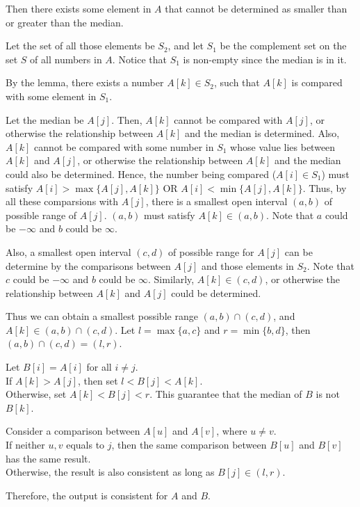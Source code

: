 \documentclass[10pt]{article}
\newcommand{\oor}{\mbox{ OR }}
\begin{document}
\begin{enumerate}
	Then there exists some element in $A$ that cannot be determined as smaller
	than or greater than the median.

	Let the set of all those elements be $S_2$, and let $S_1$ be the complement set
	on the set $S$ of all numbers in $A$.
	Notice that $S_1$ is non-empty since the median is in it.

	By the lemma, there exists a number $A[k] \in S_2$, such that $A[k]$ is
	compared with some element in $S_1$.

	Let the median be $A[j]$.
	Then, $A[k]$ cannot be compared with $A[j]$, or otherwise the relationship
	between $A[k]$ and the median is determined.
	Also, $A[k]$ cannot be compared with some number in $S_1$ whose value lies
	between $A[k]$ and $A[j]$, or otherwise the relationship between $A[k]$ and
	the median could also be determined.
	Hence, the number being compared ($A[i] \in S_1$) must satisfy $A[i] >
	\max\{A[j], A[k]\} \oor A[i] < \min\{A[j], A[k]\}$.
	Thus, by all these comparsions with $A[j]$, there is a smallest open
	interval $(a, b)$ of possible range of $A[j]$.
	$(a, b)$ must satisfy $A[k] \in (a, b)$.
	Note that $a$ could be $-\infty$ and $b$ could be $\infty$.

	Also, a smallest open interval $(c, d)$ of possible range for $A[j]$ can be determine by the
	comparisons between $A[j]$ and those elements in $S_2$. 
	Note that $c$ could be $-\infty$ and $b$ could be $\infty$.
	Similarly, $A[k] \in (c, d)$, or otherwise the relationship between $A[k]$
	and $A[j]$ could be determined.

	Thus we can obtain a smallest possible range $(a, b) \cap (c, d)$, and
	$A[k] \in (a, b) \cap (c, d)$. 
	Let $l = \max\{a, c\}$ and $r = \min\{b, d\}$, then $(a, b) \cap (c, d) =
	(l, r)$. 

	Let $B[i] = A[i]$ for all $i \neq j$. \\
	If $A[k] > A[j]$, then set $l < B[j] < A[k]$. \\
	Otherwise, set $A[k]< B[j] < r$.
	This guarantee that the median of $B$ is not $B[k]$.

	Consider a comparison between $A[u]$ and $A[v]$, where $u \neq v$. \\
	If neither $u, v$ equals to $j$, then the same comparison between $B[u]$
	and $B[v]$ has the same result. \\
	Otherwise, the result is also consistent as long as $B[j] \in (l, r)$. 

	Therefore, the output is consistent for $A$ and $B$.
	

\end{enumerate}
\end{document}
